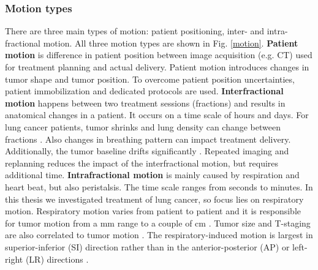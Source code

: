 \documentclass[type=dr, dr=rernat, accentcolor=tud7b,colorbacktitle, bigchapter, openright, twoside, 12pt ]{tudthesis}
\begin{document}
\newpage




\subsubsection{Motion types}

There are three main types of motion: patient positioning, inter- and intra-fractional motion. All three motion types are shown in Fig. \ref{motion}.
\newline
\textbf{Patient motion} is difference in patient position between image acquisition (e.g. CT) used for treatment planning and actual delivery. Patient motion introduces changes in tumor shape and tumor position. To overcome patient 
position uncertainties, patient immobilization and dedicated protocols are used.
\newline
\textbf{Interfractional motion} happens between two treatment sessions (fractions) and results in anatomical changes in a patient. It occurs on a time scale of hours and days. For lung cancer patients, tumor shrinks and lung density can change between fractions \cite{Mori2009}. 
Also changes in breathing pattern can impact treatment delivery. Additionally, the tumor baseline drifts significantly \cite{Sonke2008}. Repeated imaging and replanning reduces the impact of the interfractional motion, but requires additional time.
\newline
\textbf{Intrafractional motion} is mainly caused by respiration and heart beat, but also peristalsis. The time scale ranges from seconds to minutes. In this thesis we investigated treatment of lung cancer, so focus lies on respiratory motion. Respiratory motion varies from patient to patient and 
it is responsible for tumor motion from a mm range to a couple of cm \cite{Shirato2004a}. Tumor size and T-staging are also correlated to tumor motion \cite{Liu2007}. The respiratory-induced motion is largest in superior-inferior (SI) direction rather than 
in the anterior-posterior (AP) or left-right (LR) directions \cite{Seppenwoolde2002, Britton2007, Liu2007}.

\newpage
\end{document}
